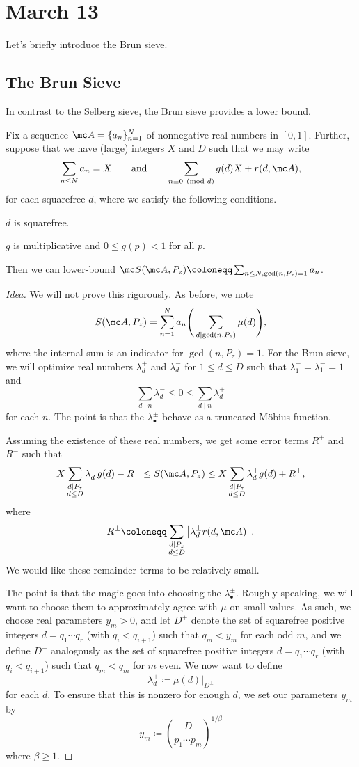 \documentclass[../notes.tex]{subfiles}
\begin{document}
\section{March 13}

Let's briefly introduce the Brun sieve.

\subsection{The Brun Sieve}
In contrast to the Selberg sieve, the Brun sieve provides a lower bound.
\begin{theorem}
	Fix a sequence $\mc A=\{a_n\}_{n=1}^N$ of nonnegative real numbers in $[0,1]$. Further, suppose that we have (large) integers $X$ and $D$ such that we may write
	\[\sum_{n\le N}a_n=X\qquad\text{and}\qquad\sum_{n\equiv0\pmod d}g(d)X+r(d,\mc A),\]
	for each squarefree $d$, where we satisfy the following conditions.
	\begin{listroman}
		\item $d$ is squarefree.
		\item $g$ is multiplicative and $0\le g(p)<1$ for all $p$.
	\end{listroman}
	Then we can lower-bound $\mc S(\mc A,P_z)\coloneqq\sum_{n\le N,\gcd(n,P_z)=1}a_n$.
\end{theorem}
\begin{proof}[Idea]
	We will not prove this rigorously. As before, we note
	\[S(\mc A,P_z)=\sum_{n=1}^Na_n\Bigg(\sum_{d\mid\gcd(n,P_z)}\mu(d)\Bigg),\]
	where the internal sum is an indicator for $\gcd(n,P_z)=1$. For the Brun sieve, we will optimize real numbers $\lambda_d^+$ and $\lambda_d^-$ for $1\le d\le D$ such that $\lambda_1^+=\lambda_1^-=1$ and
	\[\sum_{d\mid n}\lambda_d^-\le0\le\sum_{d\mid n}\lambda_d^+\]
	for each $n$. The point is that the $\lambda^\pm_\bullet$ behave as a truncated M\"obius function.

	Assuming the existence of these real numbers, we get some error terms $R^+$ and $R^-$ such that
	\[X\sum_{\substack{d\mid P_z\\d\le D}}\lambda_d^-g(d)-R^-\le S(\mc A,P_z)\le X\sum_{\substack{d\mid P_z\\d\le D}}\lambda_d^+g(d)+R^+,\]
	where
	\[R^\pm\coloneqq\sum_{\substack{d\mid P_z\\d\le D}}\left|\lambda_d^\pm r(d,\mc A)\right|.\]
	We would like these remainder terms to be relatively small.

	The point is that the magic goes into choosing the $\lambda^\pm_\bullet$. Roughly speaking, we will want to choose them to approximately agree with $\mu$ on small values. As such, we choose real parameters $y_m>0$, and let $D^+$ denote the set of squarefree positive integers $d=q_1\cdots q_r$ (with $q_i<q_{i+1}$) such that $q_m<y_m$ for each odd $m$, and we define $D^-$ analogously as the set of squarefree positive integers $d=q_1\cdots q_r$ (with $q_i<q_{i+1}$) such that $q_m<q_m$ for $m$ even. We now want to define
	\[\lambda_d^\pm\coloneqq\mu(d)|_{D^\pm}\]
	for each $d$. To ensure that this is nonzero for enough $d$, we set our parameters $y_m$ by
	\[y_m\coloneqq\left(\frac D{p_1\cdots p_m}\right)^{1/\beta}\]
	where $\beta\ge1$.
\end{proof}
\end{document}
